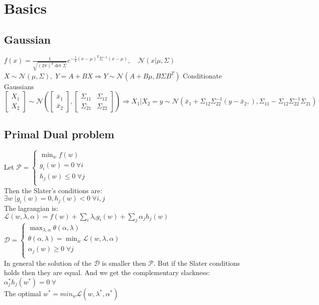 \section{Basics}

\subsection*{Gaussian}
$f(x) = \frac{1}{\sqrt{(2\pi)^d\det\Sigma}} e^{- \frac{1}{2} (x-\mu)^T \Sigma^{-1} (x-\mu)},\quad \mathcal{N}(x|\mu, \Sigma)$\\
$X {\sim} \mathcal{N}(\mu,\Sigma),\;Y{=}A{+}BX \Rightarrow Y{\sim}\mathcal{N}(A{+}B\mu,B\Sigma B^T)$ 
Conditionate Gaussians\\
\(
\begin{bmatrix} X_1 \\ X_2 \end{bmatrix} \sim \mathcal{N}\left(\begin{bmatrix}\bar{x}_1 \\ \bar{x}_2\end{bmatrix},\begin{bmatrix} \Sigma_{11}&\Sigma_{12} \\\Sigma_{21}&\Sigma_{22} \end{bmatrix}\right)
\Rightarrow X_1\vert X_2=y \sim \mathcal{N}\left(\bar{x}_1 + \Sigma_{12}\Sigma^{-1}_{22}(y-\bar{x}_2, ) , \Sigma_{11}-\Sigma_{12}\Sigma^{-1}_{22}\Sigma_{21}\right)
\)

\subsection*{Primal Dual problem}
Let \(\mathcal{P} = 
	\begin{cases}
		\min_w f(w)\\
		g_i(w)=0\;\forall i\\
		h_j(w)\leq 0\;\forall j\\
	\end{cases}
	\)\\
Then the Slater's conditions are:\\
\(\exists w\; \vert g_i(w) = 0, h_j (w) < 0 \;\forall i,j\)\\
The lagrangian is:\\
\(\mathcal{L}(w,\lambda,\alpha)=f(w) + \sum_i\lambda_ig_i(w) + \sum_j \alpha_jh_j(w)\)\\
\(\mathcal{D} = 	
\begin{cases}
	\max_{\lambda,\alpha} \theta(\alpha, \lambda)\\
	\theta(\alpha, \lambda) = \min_w \mathcal{L}(w,\lambda,\alpha)\\
	\alpha_j(w)\geq 0\;\forall j\\
\end{cases}
\)\\
In general the solution of the \(\mathcal{D}\) is smaller then $\mathcal{P}$. But if the Slater conditions holds then they are equal. And we get the complementary slackness: \(\alpha_j^*h_j(w^*) = 0\;\forall\) \\
 The optimal $w^{*} = min_w {\mathcal{L}(w,\lambda^*,\alpha^*)}$

